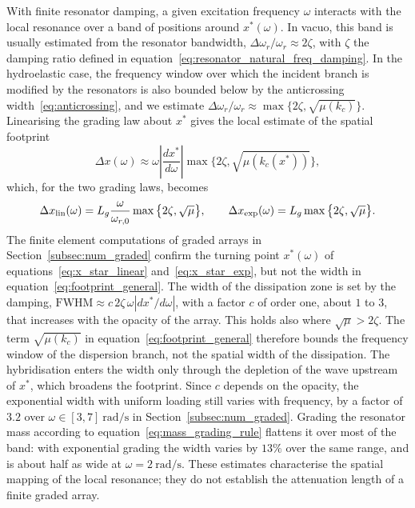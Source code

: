 With finite resonator damping, a given excitation frequency $\omega$ interacts with the local resonance over a band of positions around $x^*(\omega)$. In vacuo, this band is usually estimated from the resonator bandwidth, $\Delta\omega_r/\omega_r\approx2\zeta$, with $\zeta$ the damping ratio defined in equation~\eqref{eq:resonator_natural_freq_damping}. In the hydroelastic case, the frequency window over which the incident branch is modified by the resonators is also bounded below by the anticrossing width~\eqref{eq:anticrossing}, and we estimate $\Delta\omega_r/\omega_r\approx\max\{2\zeta,\sqrt{\mu(k_c)}\}$. Linearising the grading law about $x^*$ gives the {\color{red}local estimate of the} spatial footprint
\begin{equation}\label{eq:footprint_general}
    \Delta x(\omega)\approx\omega\left|\frac{dx^*}{d\omega}\right|\max\big\{2\zeta,\sqrt{\mu(k_c(x^*))}\big\},
\end{equation}
which, for the two grading laws, becomes
\begin{equation}\label{eq:footprint_lin_exp}
    \Delta x_{\rm lin}(\omega)=L_g\frac{\omega}{\omega_{r,0}}\max\big\{2\zeta,\sqrt{\mu}\big\},
    \qquad
    \Delta x_{\rm exp}(\omega)=L_g\max\big\{2\zeta,\sqrt{\mu}\big\}.
\end{equation}
{\color{red}The finite element computations of graded arrays in Section~\ref{subsec:num_graded} confirm the turning point $x^*(\omega)$ of equations~\eqref{eq:x_star_linear} and~\eqref{eq:x_star_exp}, but not the width in equation~\eqref{eq:footprint_general}. The width of the dissipation zone is set by the damping, $\mathrm{FWHM}\approx c\,2\zeta\,\omega|dx^*/d\omega|$, with a factor $c$ of order one, about $1$ to $3$, that increases with the opacity of the array. This holds also where $\sqrt{\mu}>2\zeta$. The term $\sqrt{\mu(k_c)}$ in equation~\eqref{eq:footprint_general} therefore bounds the frequency window of the dispersion branch, not the spatial width of the dissipation. The hybridisation enters the width only through the depletion of the wave upstream of $x^*$, which broadens the footprint. Since $c$ depends on the opacity, the exponential width with uniform loading still varies with frequency, by a factor of $3.2$ over $\omega\in[3,7]~\si{\radian\per\second}$ in Section~\ref{subsec:num_graded}. Grading the resonator mass according to equation~\eqref{eq:mass_grading_rule} flattens it over most of the band: with exponential grading the width varies by $13\%$ over the same range, and is about half as wide at $\omega=2~\si{\radian\per\second}$.} These estimates characterise the spatial mapping of the local resonance; they do not establish the attenuation length of a finite graded array.

